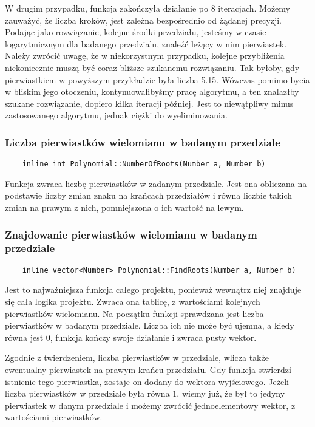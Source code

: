 \documentclass[oneside,a4paper]{book}
\begin{document}
	W drugim przypadku, funkcja zakończyła działanie po 8 iteracjach. Możemy zauważyć, że liczba kroków, jest zależna bezpośrednio od żądanej precyzji. Podając jako rozwiązanie, kolejne środki przedziału, jesteśmy w czasie logarytmicznym dla badanego przedzialu, znaleźć leżący w nim pierwiastek. Należy zwrócić uwagę, że w niekorzystnym przypadku, kolejne przybliżenia niekoniecznie muszą być coraz bliższe szukanemu rozwiązaniu. Tak byłoby, gdy pierwiastkiem w powyższym przykładzie była liczba 5.15. Wówczas pomimo bycia w bliskim jego otoczeniu, kontynuowalibyśmy pracę algorytmu, a ten znalazłby szukane rozwiązanie, dopiero kilka iteracji później. Jest to niewątpliwy minus zastosowanego algorytmu, jednak ciężki do wyeliminowania.
	\\
	
	\subsubsection{Liczba pierwiastków wielomianu w badanym przedziale}
	\begin{lstlisting}
	inline int Polynomial::NumberOfRoots(Number a, Number b)
	\end{lstlisting}
	
	Funkcja zwraca liczbę pierwiastków w zadanym przedziale. Jest ona obliczana na podstawie liczby zmian znaku na krańcach przedziałów i równa liczbie takich zmian na prawym z nich, pomniejszona o ich wartość na lewym.
	\\
	
	\subsubsection{Znajdowanie pierwiastków wielomianu w badanym przedziale}
	\begin{lstlisting}
	inline vector<Number> Polynomial::FindRoots(Number a, Number b)
	\end{lstlisting}
	
	Jest to najważniejsza funkcja całego projektu, ponieważ wewnątrz niej znajduje się cała logika projektu. Zwraca ona tablicę, z wartościami kolejnych pierwiastków wielomianu. Na początku funkcji sprawdzana jest liczba pierwiastków w badanym przedziale. Liczba ich nie może być ujemna, a kiedy równa jest $0$, funkcja kończy swoje działanie i zwraca pusty wektor.
	
	Zgodnie z twierdzeniem, liczba pierwiastków w przedziale, wlicza także ewentualny pierwiastek na prawym krańcu przedziału. Gdy funkcja stwierdzi istnienie tego pierwiastka, zostaje on dodany do wektora wyjściowego. Jeżeli liczba pierwiastków w przedziale była równa $1$, wiemy już, że był to jedyny pierwiastek w danym przedziale i możemy zwrócić jednoelementowy wektor, z wartościami pierwiastków.
	
\end{document}
